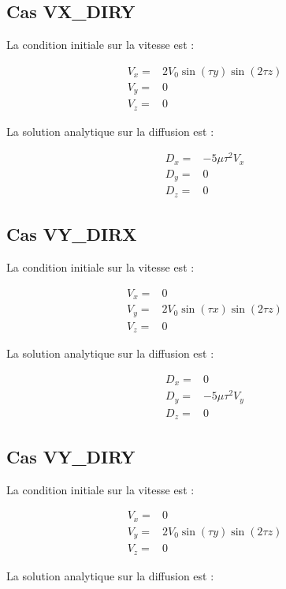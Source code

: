 \subsection{Cas VX\_DIRY}

La condition initiale sur la vitesse est :

\begin{align*}
V_x ={}& 2 V_0 \sin(\tau y) \sin(2 \tau z) \\
V_y ={}& 0 \\
V_z ={}& 0
\end{align*}

La solution analytique sur la diffusion est :

\begin{align*}
D_x ={}& -5 \mu \tau^2 V_x \\
D_y ={}& 0 \\
D_z ={}& 0
\end{align*}

\subsection{Cas VY\_DIRX}

La condition initiale sur la vitesse est :

\begin{align*}
V_x ={}& 0 \\
V_y ={}& 2 V_0 \sin(\tau x) \sin(2 \tau z) \\
V_z ={}& 0
\end{align*}

La solution analytique sur la diffusion est :

\begin{align*}
D_x ={}& 0 \\
D_y ={}& -5 \mu \tau^2 V_y \\
D_z ={}& 0
\end{align*}

\subsection{Cas VY\_DIRY}

La condition initiale sur la vitesse est :

\begin{align*}
V_x ={}& 0 \\
V_y ={}& 2 V_0 \sin(\tau y) \sin(2 \tau z) \\
V_z ={}& 0
\end{align*}

La solution analytique sur la diffusion est :

